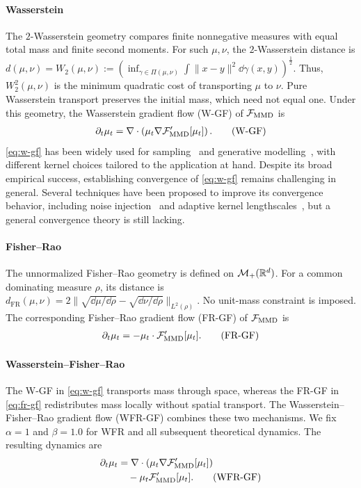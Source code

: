 \paragraph{Wasserstein} 
The $2$-Wasserstein geometry compares finite nonnegative measures with equal total mass and finite second moments. For such $\mu,\nu$, the $2$-Wasserstein distance is $d(\mu,\nu)=W_2(\mu,\nu):=\left(\inf _{\gamma \in \Pi(\mu, \nu)} \int \|x-y\|^2 \dd \gamma(x, y)\right)^{\frac{1}{2}}$. Thus, $W_2^2(\mu,\nu)$ is the minimum quadratic cost of transporting $\mu$ to $\nu$. Pure Wasserstein transport preserves the initial mass, which need not equal one. Under this geometry, the Wasserstein gradient flow (W-GF) of $\mathcal{F}_{\operatorname{MMD}}$ is~\citep{arbel2019maximum,korba2021kernel}
\begin{align*}\label{eq:w-gf}
\partial_t \mu_t = \nabla\cdot \left(\mu_t \nabla \mathcal{F}_{\operatorname{MMD}}'[\mu_t]\right). \tag{W-GF}
\end{align*}
\eqref{eq:w-gf} has been widely used for sampling~\citep{chen2025stationary} and generative modelling~\citep{galashov2024deep}, with different kernel choices tailored to the application at hand. Despite its broad empirical success, establishing convergence of \eqref{eq:w-gf} remains challenging in general. 
Several techniques have been proposed to improve its convergence behavior, including noise injection~\citep{arbel2019maximum,suzuki2023uniform,chen2026thinned} and adaptive kernel lengthscales~\citep{kang2026gradient}, but a general convergence theory is still lacking. 


\paragraph{Fisher--Rao}
The unnormalized Fisher--Rao geometry is defined on $\mathcal{M}_+(\mathbb{R}^d)$. For a common dominating measure $\rho$, its distance is $d_{\mathrm{FR}}(\mu,\nu)=2\|\sqrt{\dd\mu/\dd\rho}-\sqrt{\dd\nu/\dd\rho}\|_{L^2(\rho)}$. No unit-mass constraint is imposed.
The corresponding Fisher--Rao gradient flow (FR-GF) of $\mathcal{F}_{\operatorname{MMD}}$ is
\begin{align*}\label{eq:fr-gf}
\partial_t\mu_t = -\mu_t \cdot  \mathcal{F}_{\operatorname{MMD}}'[\mu_t] . \tag{FR-GF}
\end{align*}

\paragraph{Wasserstein--Fisher--Rao}
The W-GF in \eqref{eq:w-gf} transports mass through space, whereas the FR-GF in \eqref{eq:fr-gf} redistributes mass locally without spatial transport. The Wasserstein--Fisher--Rao gradient flow (WFR-GF) combines these two mechanisms. We fix $\alpha=1$ and $\beta=1.0$ for WFR and all subsequent theoretical dynamics. The resulting dynamics are
\begin{align*}\label{eq:wfr-gf}
\partial_t\mu_t
&=\nabla\cdot\left(\mu_t\nabla\mathcal{F}_{\operatorname{MMD}}'[\mu_t]\right) \\
&\quad-\mu_t\mathcal{F}_{\operatorname{MMD}}'[\mu_t]. \tag{WFR-GF}
\end{align*}


